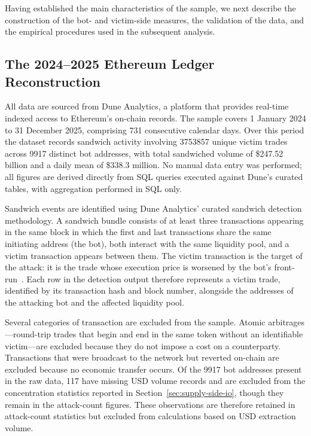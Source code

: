 \documentclass[pdflatex, sn-basic]{sn-jnl}
\theoremstyle{thmstylethree}%
\begin{document}
    Having established the main characteristics of the sample, we next describe the construction of the bot- and victim-side measures, the validation of the data, and the empirical procedures used in the subsequent analysis.
    

	\subsection{The 2024–2025 Ethereum Ledger
	Reconstruction}
	\label{subsec:ledger-reconstruction}

    All data are sourced from Dune Analytics, a platform that provides real-time indexed access to Ethereum's on-chain records.
    The sample covers 1 January 2024 to 31 December 2025, comprising \num{731} consecutive calendar days.
    Over this period the dataset records sandwich activity involving \num{3753857} unique victim trades across \num{9917} distinct bot addresses, with total sandwiched volume of \$\num{247.52} billion and a daily mean of \$\num{338.3} million.
    No manual data entry was performed; all figures are derived directly from SQL queries executed against Dune's curated tables, with aggregation performed in SQL only.
    
    Sandwich events are identified using Dune Analytics' curated sandwich detection methodology.
    A sandwich bundle consists of at least three transactions appearing in the same block in which the first and last transactions share the same initiating address (the bot), both interact with the same liquidity pool, and a victim transaction appears between them.
    The victim transaction is the target of the attack: it is the trade whose execution price is worsened by the bot's front-run~\citep{Daian2020,Heimbach2022}.
    Each row in the detection output therefore represents a victim trade, identified by its transaction hash and block number, alongside the addresses of the attacking bot and the affected liquidity pool.
    
    Several categories of transaction are excluded from the sample.
    Atomic arbitrages---round-trip trades that begin and end in the same token without an identifiable victim---are excluded because they do not impose a cost on a counterparty.
    Transactions that were broadcast to the network but reverted on-chain are excluded because no economic transfer occurs.
    Of the \num{9917} bot addresses present in the raw data, \num{117} have missing USD volume records and are excluded from the concentration statistics reported in Section~\ref{sec:supply-side-io}, though they remain in the attack-count figures.
    These observations are therefore retained in attack-count statistics but excluded from calculations based on USD extraction volume.
    
\end{document}
